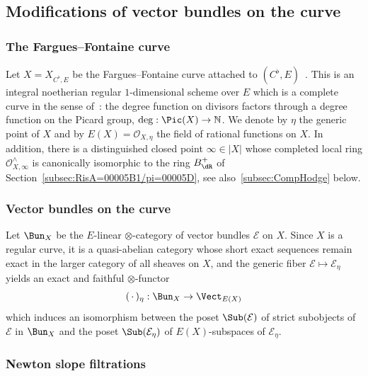 \subsection{Modifications of vector bundles on the curve}

\subsubsection{The Fargues--Fontaine curve}\label{subsec:The-Fargues--Fontaine-curve}

Let $X=X_{C^{\flat},E}$ be the Fargues--Fontaine curve attached to $(C^{\flat},E)$~\cite{FaFo15}. This is an integral noetherian regular $1$-dimensional scheme over $E$ which is a complete curve in the sense of~\cite[5.1.3]{FaFo15}: the degree function on divisors factors through a degree function on the Picard group, $\deg:\Pic(X)\rightarrow\mathbb{N}$. We denote by $\eta$ the generic point of $X$ and by $E(X)=\mathcal{O}_{X,\eta}$ the field of rational functions on $X$. In addition, there is a distinguished closed point $\infty\in\left|X\right|$ whose completed local ring $\mathcal{O}_{X,\infty}^{\wedge}$ is canonically isomorphic to the ring $B_{\dR}^{+}$ of Section~\ref{subsec:RisA=00005B1/pi=00005D}, see also~\ref{subsec:CompHodge} below.

\subsubsection{Vector bundles on the curve}

Let $\Bun_{X}$ be the $E$-linear $\otimes$-category of vector bundles $\mathcal{E}$ on $X$. Since $X$ is a regular curve, it is a quasi-abelian category whose short exact sequences remain exact in the larger category of all sheaves on $X$, and the generic fiber $\mathcal{E}\mapsto\mathcal{E}_{\eta}$ yields an exact and faithful $\otimes$-functor
\[
({\,\cdot\,})_{\eta}:\Bun_{X}\rightarrow\Vect_{E(X)}
\]
which induces an isomorphism between the poset $\Sub(\mathcal{E})$ of strict subobjects of $\mathcal{E}$ in $\Bun_{X}$ and the poset $\Sub(\mathcal{E}_{\eta})$ of $E(X)$-subspaces of $\mathcal{E}_{\eta}$.

\subsubsection{Newton slope filtrations}\label{subsec:Newton4BundlesOnCurve}

